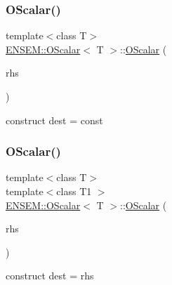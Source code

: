 \subsubsection{\texorpdfstring{OScalar()}{OScalar()}\hspace{0.1cm}{\footnotesize\ttfamily [8/12]}}
{\footnotesize\ttfamily template$<$class T$>$ \\
\mbox{\hyperlink{classENSEM_1_1OScalar}{E\+N\+S\+E\+M\+::\+O\+Scalar}}$<$ T $>$\+::\mbox{\hyperlink{classENSEM_1_1OScalar}{O\+Scalar}} (\begin{DoxyParamCaption}\item[{const typename \mbox{\hyperlink{structENSEM_1_1WordType}{Word\+Type}}$<$ T $>$\+::Type\+\_\+t \&}]{rhs }\end{DoxyParamCaption})\hspace{0.3cm}{\ttfamily [inline]}}



construct dest = const 

\mbox{\label{classENSEM_1_1OScalar_a12d201aefa6cbf8648247fdcc6f08669}} 
\subsubsection{\texorpdfstring{OScalar()}{OScalar()}\hspace{0.1cm}{\footnotesize\ttfamily [9/12]}}
{\footnotesize\ttfamily template$<$class T$>$ \\
template$<$class T1 $>$ \\
\mbox{\hyperlink{classENSEM_1_1OScalar}{E\+N\+S\+E\+M\+::\+O\+Scalar}}$<$ T $>$\+::\mbox{\hyperlink{classENSEM_1_1OScalar}{O\+Scalar}} (\begin{DoxyParamCaption}\item[{const \mbox{\hyperlink{classENSEM_1_1OScalar}{O\+Scalar}}$<$ T1 $>$ \&}]{rhs }\end{DoxyParamCaption})\hspace{0.3cm}{\ttfamily [inline]}}



construct dest = rhs 

\mbox{\label{classENSEM_1_1OScalar_a63525278c1ba085f57cdc4aafe50aaa9}} 
